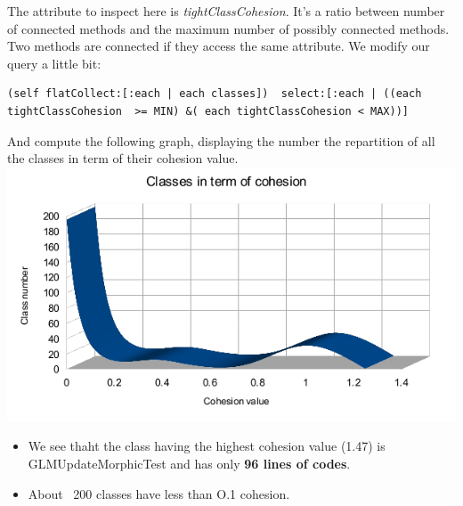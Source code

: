\documentclass[11pt,a4paper]{article}
\begin{document}
The attribute to inspect here is \textit{tightClassCohesion}. It's a ratio between number of connected methods and the maximum number of possibly connected methods. Two methods are connected if they access the same attribute. 
We modify our query a little bit:
\begin{lstlisting}
(self flatCollect:[:each | each classes])  select:[:each | ((each tightClassCohesion  >= MIN) &( each tightClassCohesion < MAX))]
\end{lstlisting}

And compute the following graph, displaying the number the repartition of all the classes in term of their cohesion value.\\
\includegraphics[width=\textwidth]{cohesion_result}

\begin{itemize}
\item We see thaht the class having the highest cohesion value (1.47) is GLMUpdateMorphicTest and has only \textbf{96 lines of codes}.\\

\item About ~200 classes have less than O.1 cohesion. 
\end{itemize}
\end{document}
